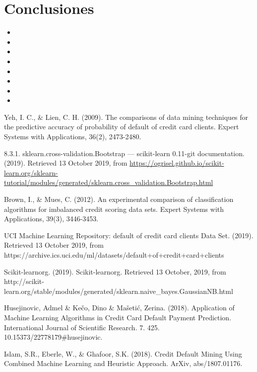 \documentclass[conference]{IEEEtran}
\begin{document}
\section{Conclusiones}
\begin{itemize}
\item 
\item
\item
\item
\item
\item
\item
\item
\end{itemize}





\begin{thebibliography}{1}
  
Yeh, I. C., \& Lien, C. H. (2009). The comparisons of data mining techniques for the predictive accuracy of probability of default of credit card clients. Expert Systems with Applications, 36(2), 2473-2480.

8.3.1. sklearn.cross-validation.Bootstrap — scikit-learn 0.11-git documentation. (2019). Retrieved 13 October 2019, from \url{https://ogrisel.github.io/scikit-learn.org/sklearn-tutorial/modules/generated/sklearn.cross_validation.Bootstrap.html}

Brown, I., \& Mues, C. (2012). An experimental comparison of classification algorithms for imbalanced credit scoring data sets. Expert Systems with Applications, 39(3), 3446-3453.

 UCI Machine Learning Repository: default of credit card clients Data Set. (2019). Retrieved 13 October 2019, from https://archive.ics.uci.edu/ml/datasets/default+of+credit+card+clients

Scikit-learnorg. (2019). Scikit-learnorg. Retrieved 13 October, 2019, from http://scikit-learn.org/stable/modules/generated/sklearn.naive\_bayes.GaussianNB.html



 Husejinovic, Admel \& Kečo, Dino \& Mašetić, Zerina. (2018). Application of Machine Learning Algorithms in Credit Card Default Payment Prediction. International Journal of Scientific Research. 7. 425. 10.15373/22778179\#husejinovic.
 
Islam, S.R., Eberle, W., \& Ghafoor, S.K. (2018). Credit Default Mining Using Combined Machine Learning and Heuristic Approach. ArXiv, abs/1807.01176.


\end{thebibliography}
\end{document}
